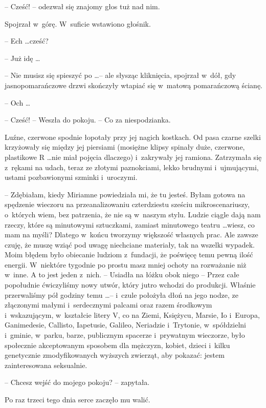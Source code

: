 \documentclass[oneside,polish,11pt,rmheadings]{mwbk}
\begin{document}
-- Cześć! -- odezwał się znajomy głos tuż nad nim. 

Spojrzał w~górę. W~suficie wstawiono głośnik. 

-- Ech \ldots  cześć? 

-- Już idę  \ldots  

-- Nie musisz się spieszyć po \ldots  -- ale słysząc kliknięcia, spojrzał w~dół, gdy jasnopomarańczowe drzwi skończyły wtapiać się w~matową pomarańczową ścianę.  

-- Och  \ldots   

-- Cześć! -- Weszła do pokoju.  -- Co za niespodzianka. 

Luźne, czerwone spodnie łopotały przy jej nagich kostkach. Od pasa czarne szelki krzyżowały się między jej piersiami (mosiężne klipsy spinały duże, czerwone, plastikowe R \ldots  nie miał pojęcia dlaczego) i~zakrywały jej ramiona. Zatrzymała się z~rękami na udach, teraz ze złotymi paznokciami, lekko brudnymi i~ujmującymi, ustami pozbawionymi szminki i~uroczymi. 

-- Zdębiałam, kiedy Miriamne powiedziała mi, że tu jesteś. Byłam gotowa na spędzenie wieczoru na przeanalizowaniu czterdziestu sześciu mikroscenariuszy, o~których wiem, bez patrzenia, że nie są w~naszym stylu. Ludzie ciągle dają nam rzeczy, które są minutowymi sztuczkami, zamiast minutowego teatru \ldots  wiesz, co mam na myśli? Dlatego w~końcu tworzymy większość własnych prac. Ale zawsze czuję, że muszę wziąć pod uwagę niechciane materiały, tak na wszelki wypadek. Moim błędem było obiecanie ludziom z~fundacji, że poświęcę temu pewną ilość energii. W~niektóre tygodnie po prostu masz mniej ochoty na rozważanie niż w~inne. A to jest jeden z~nich. -- Usiadła na łóżku obok niego -- Przez całe popołudnie ćwiczyliśmy nowy utwór, który jutro wchodzi do produkcji. Właśnie przerwaliśmy pół godziny temu \ldots  -- i~czule położyła dłoń na jego nodze, ze złączonymi małymi i~serdecznymi palcami oraz razem środkowym i~wskazującym, w~kształcie litery V, co na Ziemi, Księżycu, Marsie, Io i~Europa, Ganimedesie, Callisto, Iapetusie, Galileo, Neriadzie i~Trytonie, w~spółdzielni i~gminie, w~parku, barze, publicznym spacerze i~prywatnym wieczorze, było społecznie akceptowanym sposobem dla mężczyzn, kobiet, dzieci i~kilku genetycznie zmodyfikowanych wyższych zwierząt, aby pokazać: jestem zainteresowana seksualnie. 

-- Chcesz wejść do mojego pokoju? -- zapytała.  

Po raz trzeci tego dnia serce zaczęło mu walić. 
\end{document}
